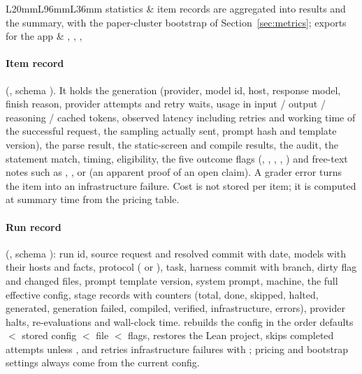 \documentclass[11pt,a4paper]{article}
\begin{document}
\begin{table}[htbp]
\begin{tabular}{L{20mm}L{96mm}L{36mm}}
statistics & item records are aggregated into results and the summary, with the paper-cluster bootstrap of Section~\ref{sec:metrics}; exports for the app & , , ,  \\
\bottomrule
\end{tabular}
\end{table}

\paragraph{Item record} (, schema ). It holds the generation (provider, model id, host, response model, finish reason, provider attempts and retry waits, usage in input / output / reasoning / cached tokens, observed latency including retries and working time of the successful request, the sampling actually sent, prompt hash and template version), the parse result, the static-screen and compile results, the audit, the statement match, timing, eligibility, the five outcome flags (, , , , ) and free-text notes such as , ,  or  (an apparent proof of an open claim). A grader error turns the item into an infrastructure failure. Cost is not stored per item; it is computed at summary time from the pricing table.

\paragraph{Run record} (, schema ): run id, source request and resolved commit with date, models with their hosts and facts, protocol ( or ), task, harness commit with branch, dirty flag and changed files, prompt template version, system prompt, machine, the full effective config, stage records with counters (total, done, skipped, halted, generated, generation failed, compiled, verified, infrastructure, errors), provider halts, re-evaluations and wall-clock time.  rebuilds the config in the order defaults $<$ stored config $<$  file $<$ flags, restores the Lean project, skips completed attempts unless , and retries infrastructure failures with ; pricing and bootstrap settings always come from the current config.
\end{document}
